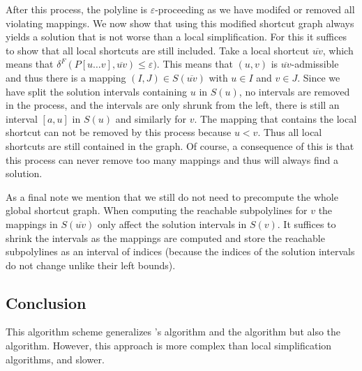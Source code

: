 After this process, the polyline is \(\varepsilon\)-proceeding as we have modifed or removed all violating mappings. We now show that using this modified shortcut graph always yields a solution that is not worse than a local simplification. For this it suffices to show that all local shortcuts are still included. Take a local shortcut \(\overline{uv}\), which means that \(\delta^F(P[u \dots v], \overline{uv}) \leq \varepsilon)\). This means that \((u, v)\) is \(\overline{uv}\)-admissible and thus there is a mapping \((I, J) \in S(\overline{uv})\) with \(u \in I\) and \(v \in J\). Since we have split the solution intervals containing \(u\) in \(S(u)\), no intervals are removed in the process, and the intervals are only shrunk from the left, there is still an interval \([a, u]\) in \(S(u)\) and similarly for \(v\). The mapping that contains the local shortcut can not be removed by this process because \(u < v\). Thus all local shortcuts are still contained in the graph. Of course, a consequence of this is that this process can never remove too many mappings and thus will always find a solution.

As a final note we mention that we still do not need to precompute the whole global shortcut graph. When computing the reachable subpolylines for \(v\) the mappings in \(S(\overline{uv})\) only affect the solution intervals in \(S(v)\). It suffices to shrink the intervals as the mappings are computed and store the reachable subpolylines as an interval of indices (because the indices of the solution intervals do not change unlike their left bounds).


\subsection{Conclusion}

This algorithm scheme generalizes \citeauthor{global_curve_simplification}'s algorithm and the \citeauthor{on_optimal_polyline_simplification_using_the_hausdorff_and_frechet_distance} algorithm but also the \citeauthor{computational_geometric_methods_for_polygonal_approximations_of_a_curve} algorithm. However, this approach is more complex than local simplification algorithms, and slower.




